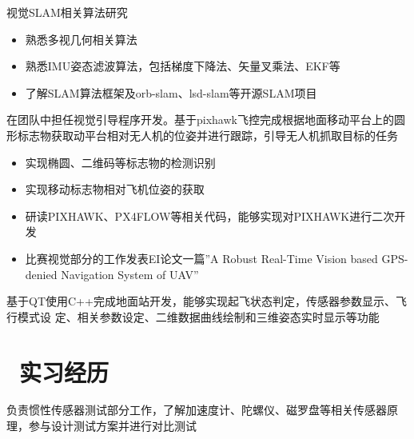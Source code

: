 \documentclass{resume}
\begin{document}
\begin{onehalfspacing} 
视觉SLAM相关算法研究
\begin{itemize}
  \item 熟悉多视几何相关算法
  \item 熟悉IMU姿态滤波算法，包括梯度下降法、矢量叉乘法、EKF等
  \item 了解SLAM算法框架及orb-slam、lsd-slam等开源SLAM项目
\end{itemize}
\end{onehalfspacing}

\begin{onehalfspacing}
在团队中担任视觉引导程序开发。基于pixhawk飞控完成根据地面移动平台上的圆形标志物获取动平台相对无人机的位姿并进行跟踪，引导无人机抓取目标的任务
\begin{itemize}
  \item 实现椭圆、二维码等标志物的检测识别
  \item 实现移动标志物相对飞机位姿的获取
  \item 研读PIXHAWK、PX4FLOW等相关代码，能够实现对PIXHAWK进行二次开发
  \item 比赛视觉部分的工作发表EI论文一篇”A Robust Real-Time Vision based GPS-denied Navigation System of UAV”
\end{itemize}
\end{onehalfspacing}

\begin{onehalfspacing}
基于QT使用C++完成地面站开发，能够实现起飞状态判定，传感器参数显示、飞行模式设
定、相关参数设定、二维数据曲线绘制和三维姿态实时显示等功能
\end{onehalfspacing}

\section{\faEye \ 实习经历}
负责惯性传感器测试部分工作，了解加速度计、陀螺仪、磁罗盘等相关传感器原理，参与设计测试方案并进行对比测试
\end{document}
